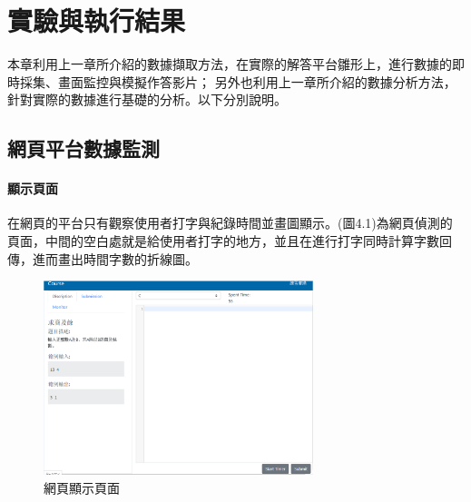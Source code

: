 \chapter{實驗與執行結果}
本章利用上一章所介紹的數據擷取方法，在實際的解答平台雛形上，進行數據的即時採集、畫面監控與模擬作答影片；
另外也利用上一章所介紹的數據分析方法，針對實際的數據進行基礎的分析。以下分別說明。
\section{網頁平台數據監測}
\subsubsection{顯示頁面}
在網頁的平台只有觀察使用者打字與紀錄時間並畫圖顯示。(圖4.1)為網頁偵測的頁面，中間的空白處就是給使用者打字的地方，並且在進行打字同時計算字數回傳，進而畫出時間字數的折線圖。
	\begin{figure}[H] 
	\centering 
	\includegraphics[width=0.7\textwidth]{web_part.png} 
	\caption{網頁顯示頁面} 
	\label{Fig.4.1} 
	\end{figure}

